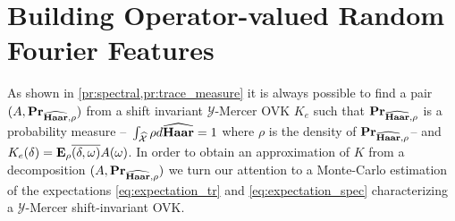 \section{Building Operator-valued Random Fourier Features}
\label{sec:building_ORFF}
As shown in \cref{pr:spectral,pr:trace_measure} it is always possible to find a pair $(A, {\mathbf{{Pr}}}_{\widehat{\mathbf{Haar}},\rho})$ from a shift invariant $\mathcal{Y}$-Mercer \acl{OVK} $K_e$ such that ${\mathbf{{Pr}}}_{\widehat{\mathbf{Haar}},\rho}$ is a probability measure --\ie~$\int_{\widehat{\mathcal{X}}} \rho d\widehat{\mathbf{Haar}}=1$ where $\rho$ is the density of ${\mathbf{{Pr}}}_{\widehat{\mathbf{Haar}},\rho}$-- and $K_e(\delta)={\mathbf{{E}}}_\rho{\overline{(\delta,\omega)}A(\omega)}$. In order to obtain an approximation of $K$ from a decomposition $(A, {\mathbf{{Pr}}}_{\widehat{\mathbf{Haar}},\rho})$ we turn our attention to a Monte-Carlo estimation of the expectations \cref{eq:expectation_tr} and \cref{eq:expectation_spec} characterizing a $\mathcal{Y}$-Mercer shift-invariant \acl{OVK}.
